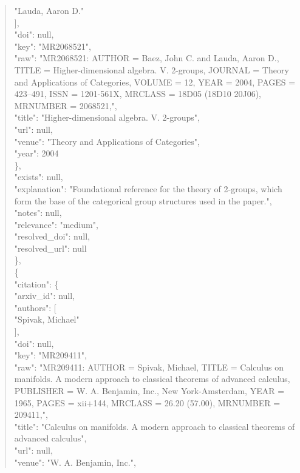 \documentclass[11pt]{article}
\begin{document}
\begin{quote}
          "Lauda, Aaron D."\\
        ],\\
        "doi": null,\\
        "key": "MR2068521",\\
        "raw": "MR2068521: AUTHOR = Baez, John C. and Lauda, Aaron D., TITLE = Higher-dimensional algebra. V. 2-groups, JOURNAL = Theory and Applications of Categories, VOLUME = 12, YEAR = 2004, PAGES = 423--491, ISSN = 1201-561X, MRCLASS = 18D05 (18D10 20J06), MRNUMBER = 2068521,",\\
        "title": "Higher-dimensional algebra. V. 2-groups",\\
        "url": null,\\
        "venue": "Theory and Applications of Categories",\\
        "year": 2004\\
      \},\\
      "exists": null,\\
      "explanation": "Foundational reference for the theory of 2-groups, which form the base of the categorical group structures used in the paper.",\\
      "notes": null,\\
      "relevance": "medium",\\
      "resolved\_doi": null,\\
      "resolved\_url": null\\
    \},\\
    \{\\
      "citation": \{\\
        "arxiv\_id": null,\\
        "authors": [\\
          "Spivak, Michael"\\
        ],\\
        "doi": null,\\
        "key": "MR209411",\\
        "raw": "MR209411: AUTHOR = Spivak, Michael, TITLE = Calculus on manifolds. A modern approach to classical theorems of advanced calculus, PUBLISHER = W. A. Benjamin, Inc., New York-Amsterdam, YEAR = 1965, PAGES = xii+144, MRCLASS = 26.20 (57.00), MRNUMBER = 209411,",\\
        "title": "Calculus on manifolds. A modern approach to classical theorems of advanced calculus",\\
        "url": null,\\
        "venue": "W. A. Benjamin, Inc.",\\

\end{quote}
\end{document}
